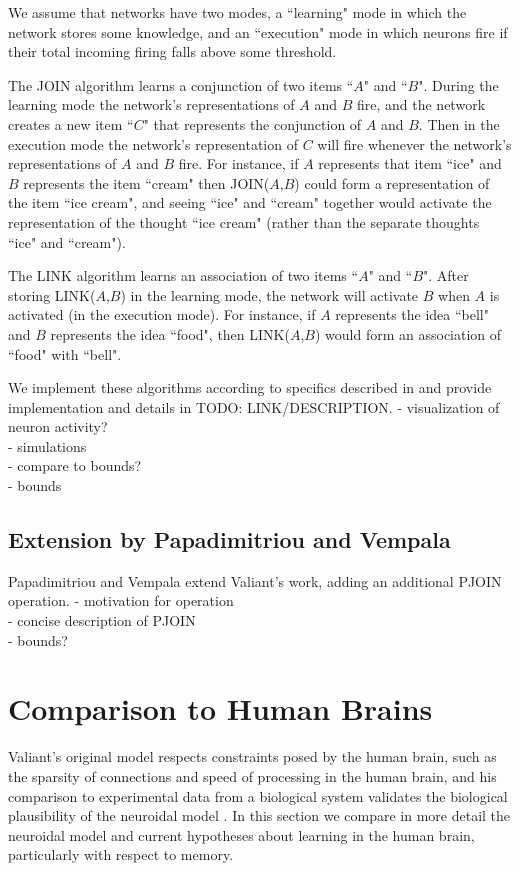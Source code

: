 \documentclass[letterpaper, 12pt]{article}
\begin{document}
We assume that networks have two modes, a ``learning" mode in which the network stores some knowledge, and an ``execution" mode in which neurons fire if their total incoming firing falls above some threshold. 

The JOIN algorithm learns a conjunction of two items ``$A$" and ``$B$". During the learning mode the network's representations of $A$ and $B$ fire, and the network creates a new item ``$C$" that represents the conjunction of $A$ and $B$. Then in the execution mode the network's representation of $C$ will fire whenever the network's representations of $A$ and $B$ fire. For instance, if $A$ represents that item ``ice" and $B$ represents the item ``cream" then JOIN($A$,$B$) could form a representation of the item ``ice cream", and seeing ``ice" and ``cream" together would activate the representation of the thought ``ice cream" (rather than the separate thoughts ``ice" and ``cream").

The LINK algorithm learns an association of two items ``$A$" and ``$B$". After storing LINK($A$,$B$) in the learning mode, the network will activate $B$ when $A$ is activated (in the execution mode). For instance, if $A$ represents the idea ``bell" and $B$ represents the idea ``food", then LINK($A$,$B$) would form an association of ``food" with ``bell".

We implement these algorithms according to specifics described in \cite{valiant_memorization_2005} and provide implementation and details in TODO: LINK/DESCRIPTION.
- visualization of neuron activity?\\
- simulations\\
- compare to bounds?\\
- bounds\\

\subsection{Extension by Papadimitriou and Vempala}\label{sec:pjoin}
Papadimitriou and Vempala \cite{papadimitriou_cortical_2015} extend Valiant's work, adding an additional PJOIN operation.
- motivation for operation\\
- concise description of PJOIN\\
- bounds?\\

\section{Comparison to Human Brains}
Valiant's original model respects constraints posed by the human brain, such as the sparsity of connections and speed of processing in the human brain, and his comparison to experimental data from a biological system validates the biological plausibility of the neuroidal model \cite{valiant_quantitative_2006}. In this section we compare in more detail the neuroidal model and current hypotheses about learning in the human brain, particularly with respect to memory.
\end{document}
